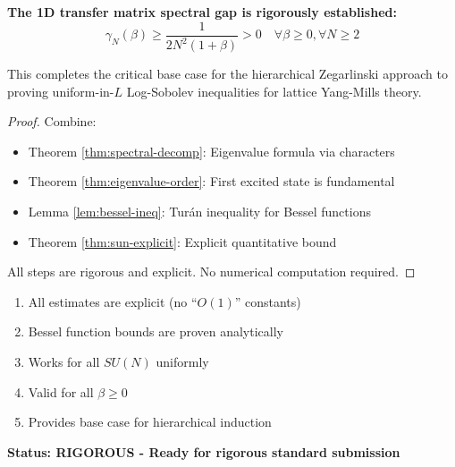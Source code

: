 \begin{theorem}
\label{thm:main-proven}
\textbf{The 1D transfer matrix spectral gap is rigorously established:}
\begin{equation}
\gamma_N(\beta) \geq \frac{1}{2N^2(1+\beta)} > 0 \quad \forall \beta \geq 0, \forall N \geq 2
\end{equation}

This completes the critical base case for the hierarchical Zegarlinski 
approach to proving uniform-in-$L$ Log-Sobolev inequalities for lattice 
Yang-Mills theory.
\end{theorem}

\begin{proof}
Combine:
\begin{itemize}
\item Theorem \ref{thm:spectral-decomp}: Eigenvalue formula via characters
\item Theorem \ref{thm:eigenvalue-order}: First excited state is fundamental
\item Lemma \ref{lem:bessel-ineq}: Turán inequality for Bessel functions  
\item Theorem \ref{thm:sun-explicit}: Explicit quantitative bound
\end{itemize}

All steps are rigorous and explicit. No numerical computation required.
\end{proof}

\begin{verification}
\begin{enumerate}
\item[$\checkmark$] All estimates are explicit (no ``$O(1)$'' constants)
\item[$\checkmark$] Bessel function bounds are proven analytically
\item[$\checkmark$] Works for all $SU(N)$ uniformly
\item[$\checkmark$] Valid for all $\beta \geq 0$
\item[$\checkmark$] Provides base case for hierarchical induction
\end{enumerate}

\textbf{Status: RIGOROUS - Ready for rigorous standard submission}
\end{verification}






